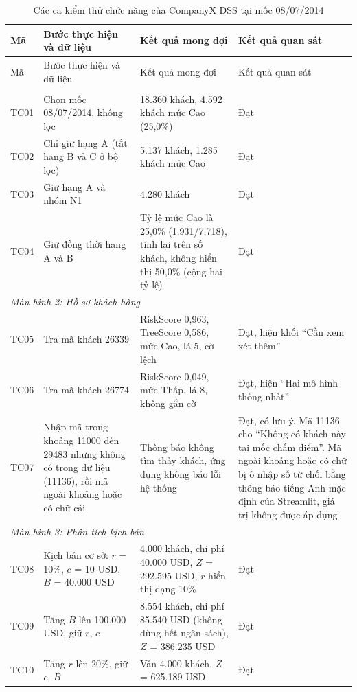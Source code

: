 {\footnotesize\renewcommand{\arraystretch}{1.2}
\begin{longtable}{p{0.95cm}p{4.0cm}p{4.3cm}p{5.5cm}}
\caption{Các ca kiểm thử chức năng của CompanyX DSS tại mốc 08/07/2014}\label{tab:kiemthu}\\
\toprule
Mã & Bước thực hiện và dữ liệu & Kết quả mong đợi & Kết quả quan sát \\
\midrule
\endfirsthead
\toprule
Mã & Bước thực hiện và dữ liệu & Kết quả mong đợi & Kết quả quan sát \\
\midrule
\endhead
\bottomrule
\endlastfoot
\multicolumn{4}{l}{\textit{Màn hình 1: Tổng quan rủi ro}} \\
TC01 & Chọn mốc 08/07/2014, không lọc & 18.360 khách, 4.592 khách mức Cao (25,0\%) & Đạt \\
TC02 & Chỉ giữ hạng A (tắt hạng B và C ở bộ lọc) & 5.137 khách, 1.285 khách mức Cao & Đạt \\
TC03 & Giữ hạng A và nhóm N1 & 4.280 khách & Đạt \\
TC04 & Giữ đồng thời hạng A và B & Tỷ lệ mức Cao là 25,0\% (1.931/7.718), tính lại trên số khách, không hiển thị 50,0\% (cộng hai tỷ lệ) & Đạt \\
\midrule
\multicolumn{4}{l}{\textit{Màn hình 2: Hồ sơ khách hàng}} \\
TC05 & Tra mã khách 26339 & RiskScore 0,963, TreeScore 0,586, mức Cao, lá 5, cờ lệch & Đạt, hiện khối ``Cần xem xét thêm'' \\
TC06 & Tra mã khách 26774 & RiskScore 0,049, mức Thấp, lá 8, không gắn cờ & Đạt, hiện ``Hai mô hình thống nhất'' \\
TC07 & Nhập mã trong khoảng 11000 đến 29483 nhưng không có trong dữ liệu (11136), rồi mã ngoài khoảng hoặc có chữ cái & Thông báo không tìm thấy khách, ứng dụng không báo lỗi hệ thống & Đạt, có lưu ý. Mã 11136 cho ``Không có khách này tại mốc chấm điểm''. Mã ngoài khoảng hoặc có chữ bị ô nhập số từ chối bằng thông báo tiếng Anh mặc định của Streamlit, giá trị không được áp dụng \\
\midrule
\multicolumn{4}{l}{\textit{Màn hình 3: Phân tích kịch bản}} \\
TC08 & Kịch bản cơ sở: $r$ = 10\%, $c$ = 10 USD, $B$ = 40.000 USD & 4.000 khách, chi phí 40.000 USD, $Z$ = 292.595 USD, $r$ hiển thị dạng 10\% & Đạt \\
TC09 & Tăng $B$ lên 100.000 USD, giữ $r$, $c$ & 8.554 khách, chi phí 85.540 USD (không dùng hết ngân sách), $Z$ = 386.235 USD & Đạt \\
TC10 & Tăng $r$ lên 20\%, giữ $c$, $B$ & Vẫn 4.000 khách, $Z$ = 625.189 USD & Đạt \\

\end{longtable}}
